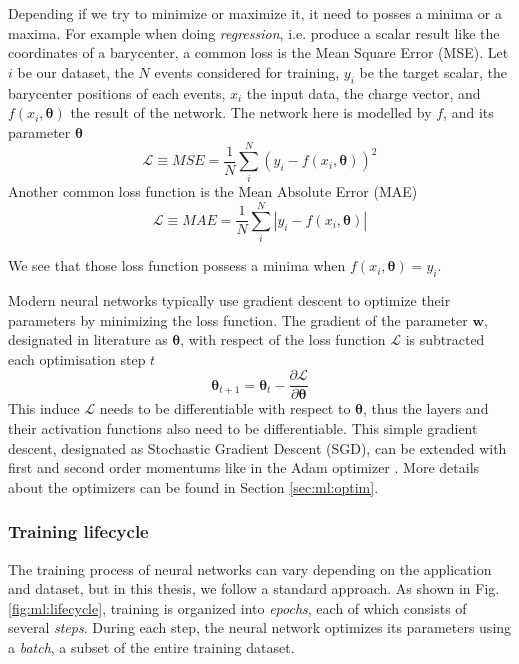 \documentclass[../main.tex]{subfiles}
\begin{document}
Depending if we try to minimize or maximize it, it need to posses a minima or a maxima. For example when doing \textit{regression}, i.e. produce a scalar result like the coordinates of a barycenter, a common loss is the Mean Square Error (MSE). Let $i$ be our dataset, the $N$ events considered for training, $y_i$ be the target scalar, the barycenter positions of each events, $x_i$ the input data, the charge vector, and $f(x_i, \bm{\theta})$ the result of the network. The network here is modelled by $f$, and its parameter $\bm{\theta}$
\begin{equation}
  \mathcal{L} \equiv MSE = \frac{1}{N} \sum_i^N (y_i - f(x_i, \bm{\theta}))^2
\end{equation}
Another common loss function is the Mean Absolute Error (MAE)
\begin{equation}
  \mathcal{L} \equiv MAE = \frac{1}{N} \sum_i^N |y_i - f(x_i, \bm{\theta})|
\end{equation}

We see that those loss function possess a minima when $f(x_i, \bm{\theta}) = y_i$.


Modern neural networks typically use gradient descent to optimize their parameters by minimizing the loss function. The gradient of the parameter $\bm{w}$, designated in literature as $\bm{\theta}$, with respect of the loss function $\mathcal{L}$ is subtracted each optimisation step $t$
\begin{equation}
  \bm{\theta}_{t+1} = \bm{\theta}_t - \frac{\partial \mathcal{L}}{\partial \bm{\theta}}
\end{equation}
This induce $\mathcal{L}$  needs to be differentiable with respect to $\bm{\theta}$, thus the layers and their activation functions also need to be differentiable. This simple gradient descent, designated as Stochastic Gradient Descent (SGD), can be extended with first and second order momentums like in the Adam optimizer \cite{kingma_adam_2017}. More details about the optimizers can be found in Section \ref{sec:ml:optim}.

\subsubsection{Training lifecycle}

The training process of neural networks can vary depending on the application and dataset, but in this thesis, we follow a standard approach. As shown in Fig. \ref{fig:ml:lifecycle}, training is organized into \textit{epochs}, each of which consists of several \textit{steps}. During each step, the neural network optimizes its parameters using a \textit{batch}, a subset of the entire training dataset.
\end{document}
